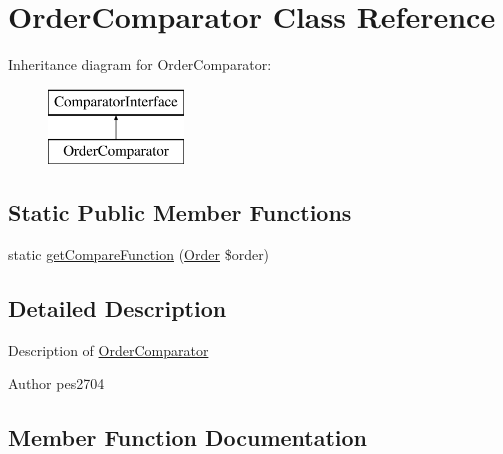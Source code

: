 \hypertarget{class_pes_1_1_comparator_1_1_order_comparator}{}\section{Order\+Comparator Class Reference}
\label{class_pes_1_1_comparator_1_1_order_comparator}
Inheritance diagram for Order\+Comparator\+:\begin{figure}[H]
\begin{center}
\leavevmode
\includegraphics[height=2.000000cm]{class_pes_1_1_comparator_1_1_order_comparator}
\end{center}
\end{figure}
\subsection*{Static Public Member Functions}
\begin{DoxyCompactItemize}
\item 
static \mbox{\hyperlink{class_pes_1_1_comparator_1_1_order_comparator_a21aeb75d37fce6724b5a60f836dfc85c}{get\+Compare\+Function}} (\mbox{\hyperlink{class_pes_1_1_query_1_1_order}{Order}} \$order)
\end{DoxyCompactItemize}


\subsection{Detailed Description}
Description of \mbox{\hyperlink{class_pes_1_1_comparator_1_1_order_comparator}{Order\+Comparator}}

\begin{DoxyAuthor}{Author}
pes2704 
\end{DoxyAuthor}


\subsection{Member Function Documentation}
\mbox{\label{class_pes_1_1_comparator_1_1_order_comparator_a21aeb75d37fce6724b5a60f836dfc85c}} 
